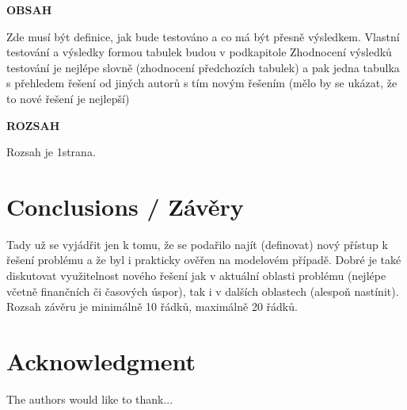 \documentclass[conference]{IEEEtran}
\begin{document}
\textbf{OBSAH}

Zde musí být definice, jak bude testováno a co má být přesně výsledkem.
Vlastní testování a výsledky formou tabulek budou v podkapitole
Zhodnocení výsledků testování je nejlépe slovně (zhodnocení předchozích tabulek) a pak jedna tabulka s přehledem řešení od jiných autorů s tím novým řešením (mělo by se ukázat, že to nové řešení je nejlepší)

\textbf{ROZSAH}

Rozsah je 1strana.

\section{Conclusions / Závěry}

Tady už se vyjádřit jen k tomu, že se podařilo najít (definovat) nový přístup k řešení problému a že byl i prakticky ověřen na modelovém případě. 
Dobré je také diskutovat využitelnost nového řešení jak v aktuální oblasti problému (nejlépe včetně finančních či časových úspor), tak i v dalších oblastech (alespoň nastínit).
Rozsah závěru je minimálně 10 řádků, maximálně 20 řádků.







\section*{Acknowledgment}


The authors would like to thank...






\end{document}
